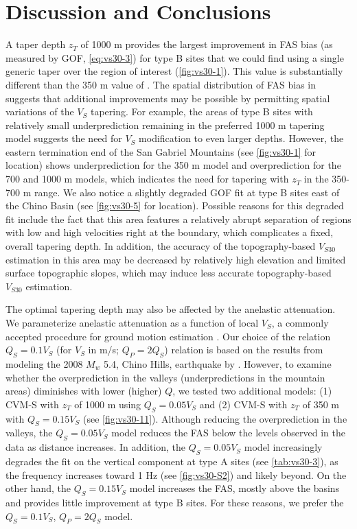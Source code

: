 \section{Discussion and Conclusions}
A taper depth $z_T$ of 1000 m provides the largest improvement in FAS bias (as measured by GOF, \cref{eq:vs30-3}) for type B sites that we could find using a single generic taper over the region of interest (\cref{fig:vs30-1}). This value is substantially different than the 350 m value of \citet{elyVs30derivedNearsurfaceSeismic2010}. The spatial distribution of FAS bias in  suggests that additional improvements may be possible by permitting spatial variations of the $V_S$ tapering. For example, the areas of type B sites with relatively small underprediction remaining in the preferred 1000 m tapering model suggests the need for $V_S$ modification to even larger depths. However, the eastern termination end of the San Gabriel Mountains (see \cref{fig:vs30-1} for location) shows underprediction for the 350 m model and overprediction for the 700 and 1000 m models, which indicates the need for tapering with $z_T$ in the 350-700 m range. We also notice a slightly degraded GOF fit at type B sites east of the Chino Basin (see \cref{fig:vs30-5} for location). Possible reasons for this degraded fit include the fact that this area features a relatively abrupt separation of regions with low and high velocities right at the boundary, which complicates a fixed, overall tapering depth. In addition, the accuracy of the topography-based $V_{S30}$ estimation in this area may be decreased by relatively high elevation and limited surface topographic slopes, which may induce less accurate topography-based $V_{S30}$ estimation.

The optimal tapering depth may also be affected by the anelastic attenuation. We parameterize anelastic attenuation as a function of local $V_S$, a commonly accepted procedure for ground motion estimation . Our choice of the relation $Q_S=0.1V_S$ (for $V_S$ in m/s; $Q_P=2Q_S$) relation is based on the results from modeling the 2008 $M_w$ 5.4, Chino Hills, earthquake by \citet{savranModelSmallscaleCrustal2016}. However, to examine whether the overprediction in the valleys (underpredictions in the mountain areas) diminishes with lower (higher) $Q$, we tested two additional models: (1) CVM-S with $z_T$ of 1000 m using $Q_S=0.05V_S$ and (2) CVM-S with $z_T$ of 350 m with $Q_S=0.15V_S$ (see \cref{fig:vs30-11}). Although reducing the overprediction in the valleys, the $Q_S=0.05V_S$ model reduces the FAS below the levels observed in the data as distance increases. In addition, the $Q_S=0.05V_S$ model increasingly degrades the fit on the vertical component at type A sites (see \cref{tab:vs30-3}), as the frequency increases toward 1 Hz (see \cref{fig:vs30-S2}) and likely beyond. On the other hand, the $Q_S=0.15V_S$ model increases the FAS, mostly above the basins and provides little improvement at type B sites. For these reasons, we prefer the $Q_S=0.1V_S$, $Q_P=2Q_S$ model.

